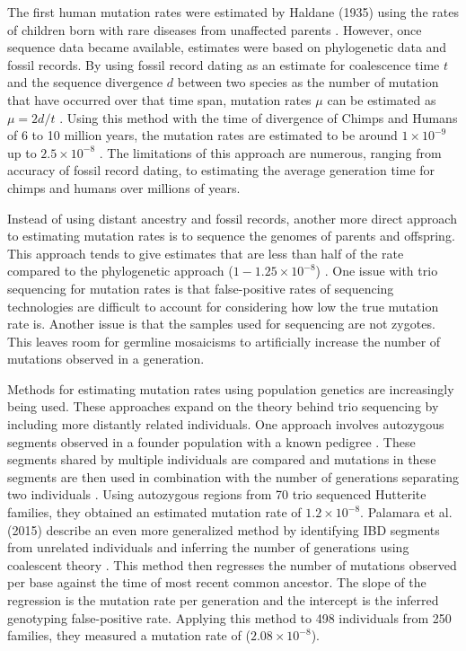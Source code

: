 \documentclass[
11pt, %
oneside, %
english, %
doublespacing, %
headsepline, %
chapterinoneline, %
]{MastersDoctoralThesis} %
\begin{document}
The first human mutation rates were estimated by Haldane (1935) using the rates of children born with rare diseases from unaffected parents \citep{Haldane1935}.
However, once sequence data became available, estimates were based on phylogenetic data and fossil records.
By using fossil record dating as an estimate for coalescence time $t$ and the sequence divergence $d$ between two species as the number of mutation that have occurred over that time span, mutation rates $\mu$ can be estimated as $\mu = 2d/t$ \citep{Scally2012}. 
Using this method with the time of divergence of Chimps and Humans of 6 to 10 million years, the mutation rates are estimated to be around $1\times10^{-9}$ up to $2.5\times10^{-8}$ \citep{Takahata1997, Scally2012, Moorjani2016, Narasimhan2016}.
The limitations of this approach are numerous, ranging from accuracy of fossil record dating, to estimating the average generation time for chimps and humans over millions of years.

Instead of using distant ancestry and fossil records, another more direct approach to estimating mutation rates is to sequence the genomes of parents and offspring. 
This approach tends to give estimates that are less than half of the rate compared to the phylogenetic approach ($1-1.25\times10^{-8}$) \citep{Shendure2015,Narasimhan2016}.
One issue with trio sequencing for mutation rates is that false-positive rates of sequencing technologies are difficult to account for considering how low the true mutation rate is.
Another issue is that the samples used for sequencing are not zygotes.
This leaves room for germline mosaicisms to artificially increase the number of mutations observed in a generation.

Methods for estimating mutation rates using population genetics are increasingly being used.
These approaches expand on the theory behind trio sequencing by including more distantly related individuals.
One approach involves autozygous segments observed in a founder population with a known pedigree \citep{Campbell2012}.
These segments shared by multiple individuals are compared and mutations in these segments are then used in combination with the number of generations separating two individuals \citep{Campbell2012}.
Using autozygous regions from 70 trio sequenced Hutterite families, they obtained an estimated mutation rate of $1.2\times10^{-8}$.
Palamara et al. (2015) describe an even more generalized method by identifying IBD segments from unrelated individuals and inferring the number of generations using coalescent theory \citep{Palamara2015,Baharian2016}.
This method then regresses the number of mutations observed per base against the time of most recent common ancestor.
The slope of the regression is the mutation rate per generation and the intercept is the inferred genotyping false-positive rate.
Applying this method to 498 individuals from 250 families, they measured a mutation rate of ($2.08\times10^{-8}$).
\end{document}
